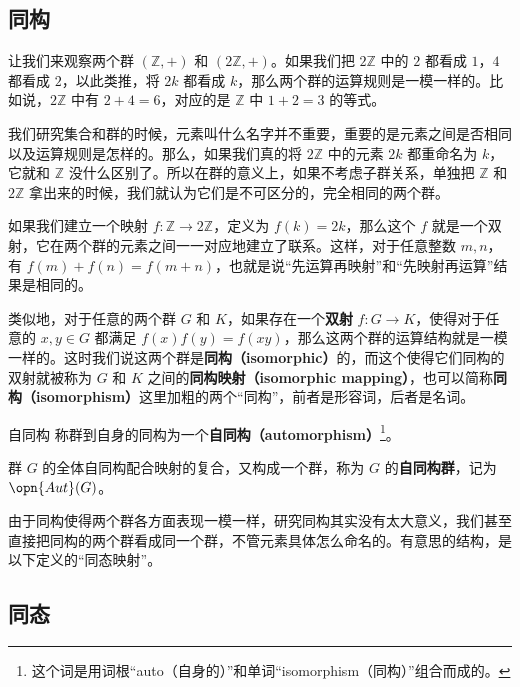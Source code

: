 

\subsection{同构}

让我们来观察两个群 $(\mathbb{Z}, +)$ 和 $(2\mathbb{Z},+)$。如果我们把 $2\mathbb{Z}$ 中的 $2$ 都看成 $1$，$4$ 都看成 $2$，以此类推，将 $2k$ 都看成 $k$，那么两个群的运算规则是一模一样的。比如说，$2\mathbb{Z}$ 中有 $2+4=6$，对应的是 $\mathbb{Z}$ 中 $1+2=3$ 的等式。

我们研究集合和群的时候，元素叫什么名字并不重要，重要的是元素之间是否相同以及运算规则是怎样的。那么，如果我们真的将 $2\mathbb{Z}$ 中的元素 $2k$ 都重命名为 $k$，它就和 $\mathbb{Z}$ 没什么区别了。所以在群的意义上，如果不考虑子群关系，单独把 $\mathbb{Z}$ 和 $2\mathbb{Z}$ 拿出来的时候，我们就认为它们是不可区分的，完全相同的两个群。

如果我们建立一个映射 $f:\mathbb{Z}\rightarrow2\mathbb{Z}$，定义为 $f(k)=2k$，那么这个 $f$ 就是一个双射，它在两个群的元素之间一一对应地建立了联系。这样，对于任意整数 $m, n$，有 $f(m)+f(n)=f(m+n)$，也就是说“先运算再映射”和“先映射再运算”结果是相同的。

类似地，对于任意的两个群 $G$ 和 $K$，如果存在一个\textbf{双射} $f:G\rightarrow K$，使得对于任意的 $x, y\in G$ 都满足 $f(x)f(y)=f(xy)$，那么这两个群的运算结构就是一模一样的。这时我们说这两个群是\textbf{同构（isomorphic）}的，而这个使得它们同构的双射就被称为 $G$ 和 $K$ 之间的\textbf{同构映射（isomorphic mapping）}，也可以简称\textbf{同构（isomorphism）}这里加粗的两个“同构”，前者是形容词，后者是名词。

\begin{definition}{自同构}
称群到自身的同构为一个\textbf{自同构（automorphism）}\footnote{这个词是用词根“auto（自身的）”和单词“isomorphism（同构）”组合而成的。}。


群 $G$ 的全体自同构配合映射的复合，又构成一个群，称为 $G$ 的\textbf{自同构群}，记为 $\opn{Aut}(G)$。


\end{definition}

由于同构使得两个群各方面表现一模一样，研究同构其实没有太大意义，我们甚至直接把同构的两个群看成同一个群，不管元素具体怎么命名的。有意思的结构，是以下定义的“同态映射”。

\subsection{同态}

